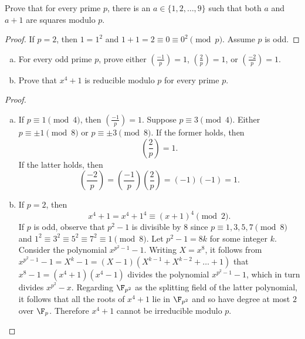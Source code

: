 \documentclass[10pt]{amsart}
\begin{document}
\begin{thm}
  Prove that for every prime $p$, there is an $a \in \{1,2,\ldots,9\}$ such that both $a$ and $a + 1$ are squares modulo $p$.

  \begin{proof}
    If $p = 2$, then $1 = 1^2$ and $1 + 1 = 2 \equiv 0 \equiv 0^2 \pmod{p}$.
    Assume $p$ is odd.
  \end{proof}
\end{thm}

\begin{thm}
  \begin{enumerate}[(a)]
  \item
    For every odd prime $p$, prove either $\left(\frac{-1}{p}\right) = 1$, $\left(\frac{2}{p}\right) = 1$, or $\left(\frac{-2}{p}\right) = 1$.
  \item
    Prove that $x^4 + 1$ is reducible modulo $p$ for every prime $p$.
  \end{enumerate}

  \begin{proof}
    \begin{enumerate}[(a)]
    \item
      If $p \equiv 1 \pmod{4}$, then $\left(\frac{-1}{p}\right) = 1$.
      Suppose $p \equiv 3 \pmod{4}$.
      Either $p \equiv \pm 1 \pmod{8}$ or $p \equiv \pm 3 \pmod{8}$.
      If the former holds, then
      $$\left(\frac{2}{p}\right) = 1.$$
      If the latter holds, then
      $$\left(\frac{-2}{p}\right) = \left(\frac{-1}{p}\right)\left(\frac{2}{p}\right) = (-1)(-1) = 1.$$
    \item
      If $p = 2$, then 
        $$x^4 + 1 = x^4 + 1^4 \equiv (x + 1)^4 \pmod{2}.$$
        If $p$ is odd, observe that $p^2 - 1$ is divisible by 8 since $p \equiv 1, 3, 5, 7 \pmod{8}$ and $1^2 \equiv 3^2 \equiv 5^2 \equiv 7^2 \equiv 1 \pmod{8}$.
        Let $p^2 - 1 = 8k$ for some integer $k$.
        Consider the polynomial $x^{p^2 - 1} - 1$.
        Writing $X = x^8$, it follows from $x^{p^2 - 1} - 1 = X^k - 1 = (X - 1)(X^{k - 1} + X^{k - 2} + \ldots + 1)$ that $x^8 - 1 = (x^4 + 1)(x^4 - 1)$ divides the polynomial $x^{p^2 - 1} - 1$, which in turn divides $x^{p^2} - x$.
        Regarding $\F_{p^2}$ as the splitting field of the latter polynomial, it follows that all the roots of $x^4 + 1$ lie in $\F_{p^2}$ and so have degree at most $2$ over $\F_p$.
        Therefore $x^4 + 1$ cannot be irreducible modulo $p$.
    \end{enumerate}
  \end{proof}
\end{thm}
\end{document}
